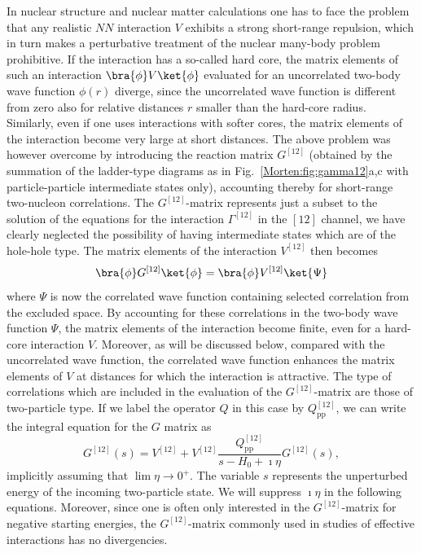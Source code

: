 In nuclear structure and nuclear matter calculations one has to
face the problem that any realistic $NN$ interaction $V$
exhibits a strong short-range repulsion, 
which in turn makes a perturbative treatment of the nuclear many-body
problem prohibitive. If the interaction has a so-called hard core, the
matrix elements of such an interaction $\bra{\phi}V\ket{\phi}$
evaluated for an uncorrelated two-body wave function $\phi (r)$
diverge, since the uncorrelated wave function is different from zero
also for relative distances $r$ smaller than the hard-core
radius. Similarly, even if one uses interactions with softer cores,
the matrix elements of the interaction become very large at short
distances.  The above problem was however overcome by introducing the
reaction matrix $G^{[12]}$ 
(obtained by the summation of the ladder-type
diagrams as in Fig.~\ref{Morten:fig:gamma12}a,c with particle-particle
intermediate states only), accounting thereby for short-range
two-nucleon correlations.  The $G^{[12]}$-matrix represents just a
subset to the solution of the equations for the interaction
$\Gamma^{[12]}$ in the $[12]$ channel, we have clearly neglected the
possibility of having intermediate states which are of the hole-hole
type.  The matrix elements of the interaction $V^{[12]}$ then becomes
\begin{equation}
\bra{\phi}G^{[12]}\ket{\phi} =\bra{\phi}V^{[12]}\ket{\Psi}
\end{equation}
where $\Psi$ is now the correlated wave function
containing selected correlation from the excluded space.
By accounting for these
correlations in the two-body wave function $\Psi$, the matrix elements of
the interaction become finite, even for a hard-core interaction $V$. Moreover,
as will be discussed below, compared with the uncorrelated
wave function, the correlated wave function enhances the
matrix elements of $V$ at distances for which the interaction is
attractive.
The type of correlations which  are included in the evaluation
of the $G^{[12]}$-matrix are those of two-particle type.
If we label the operator $Q$ in this case by $Q^{[12]}_{\mathrm{pp}}$, we can write
the integral equation for the $G$ matrix as 
\begin{equation}
   G^{[12]}(s)=V^{[12]}+V^{[12]}\frac{Q^{[12]}_{\mathrm{pp}}}
           {s -H_0+\imath \eta}G^{[12]}(s),
   \label{Morten:eq:g1}
\end{equation}
implicitly assuming that $\lim \eta \rightarrow 0^+$. 
The variable $s$ represents the unperturbed 
energy of the incoming two-particle state. We will suppress $\imath \eta$ in the 
following equations. Moreover, since one is often only  interested in the 
$G^{[12]}$-matrix
for negative starting energies, the $G^{[12]}$-matrix commonly used in studies
of effective interactions has no divergencies.

